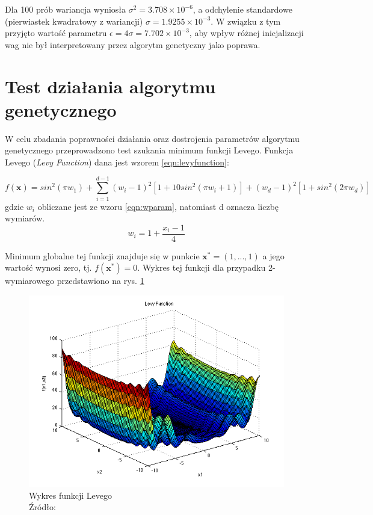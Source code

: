 Dla 100 prób wariancja wyniosła $\sigma^2 =3.708 \times 10^{-6}$, a odchylenie standardowe (pierwiastek kwadratowy z wariancji) $\sigma =1.9255 \times 10^{-3}$.
W związku z tym przyjęto wartość parametru $\epsilon = 4\sigma = 7.702 \times 10^{-3}$, aby wpływ różnej inicjalizacji wag nie był interpretowany przez algorytm genetyczny jako poprawa.

\section{Test działania algorytmu genetycznego}\label{sec:levy_test}
W celu zbadania poprawności działania oraz dostrojenia parametrów algorytmu genetycznego przeprowadzono test szukania minimum funkcji Levego.
Funkcja Levego (\textit{Levy Function}) dana jest wzorem \ref{eqn:levyfunction}:

\begin{equation}\label{eqn:levyfunction}
  f(\mathbf{x}) = sin^2(\pi w_1) + \sum_{i=1}^{d-1} (w_i - 1)^2 [ 1 + 10sin^2(\pi w_i + 1)] + (w_d - 1)^2 [1 + sin^2(2 \pi w_d)]
\end{equation}
gdzie $w_i$ obliczane jest ze wzoru \ref{eqn:wparam}, natomiast d oznacza liczbę wymiarów.
\begin{equation}\label{eqn:wparam}
  w_i = 1 + \frac{x_i - 1}{4}
\end{equation}

Minimum globalne tej funkcji znajduje się w punkcie $ \mathbf{x^*} = (1, ..., 1) $ a jego wartość wynosi zero, tj. $ f(\mathbf{x^*}) = 0 $. \cite{simulationlib}
Wykres tej funkcji dla przypadku 2-wymiarowego przedstawiono na rys. \ref{fig:levyfunction}

\begin{figure}[h!tb]
	 \centering
	 \includegraphics[width = 1.0\linewidth]{img/levy}
	 \caption{Wykres funkcji Levego \\
              Źródło: \cite{simulationlib}}
	 \label{fig:levyfunction}
\end{figure}


